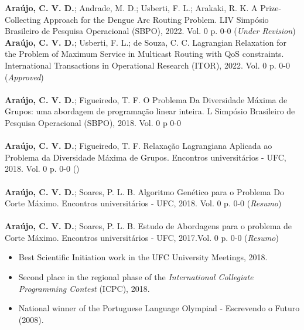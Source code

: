 \documentclass[10pt,a4paper,ragged2e,withhyper]{altacv}
\begin{document}
\begin{paracol}{1}
        \medskip
        \textbf{Araújo, C. V. D.}; Andrade, M. D.; Usberti, F. L.; Arakaki, R. K.
        \textcolor{SecondaryColor}{A Prize-Collecting Approach for the Dengue
          Arc Routing Problem}. LIV Simpósio Brasileiro de Pesquisa Operacional
        (SBPO), 2022. Vol. 0 p. 0-0 (\emph{Under Revision}) \\
        \textbf{Araújo, C. V. D.}; Usberti, F. L.; de Souza, C. C.
        \textcolor{SecondaryColor}{Lagrangian Relaxation for the Problem of Maximum Service in Multicast Routing with QoS constraints}. International Transactions in Operational Research (ITOR), 2022. Vol. 0 p. 0-0 (\emph{Approved}) \\
        \divider \\
        \textbf{Araújo, C. V. D.}; Figueiredo, T. F.
        \textcolor{SecondaryColor}{O Problema Da Diversidade Máxima de Grupos: uma abordagem de programação linear inteira}.  L Simpósio Brasileiro de Pesquisa Operacional (SBPO), 2018. Vol. 0 p 0-0 \\
    		\divider \\
    		\textbf{Araújo, C. V. D.}; Figueiredo, T. F.
    		\textcolor{SecondaryColor}{Relaxação Lagrangiana Aplicada ao Problema da Diversidade Máxima de Grupos}. Encontros universitários - UFC, 2018. Vol. 0 p. 0-0 (\emph{}) \\
    		\divider \\
    		\textbf{Araújo, C. V. D.}; Soares, P. L. B. 
    		\textcolor{SecondaryColor}{Algoritmo Genético para o Problema Do Corte Máximo}. Encontros universitários - UFC, 2018. Vol. 0 p. 0-0 (\emph{Resumo}) \\
            \divider \\
            \textbf{Araújo, C. V. D.}; Soares, P. L. B.
            \textcolor{SecondaryColor}{Estudo de Abordagens para o problema de Corte Máximo}. Encontros universitários  - UFC, 2017.Vol. 0 p. 0-0 (\emph{Resumo}) \\
	    \medskip
        \begin{itemize}
            \item Best Scientific Initiation work in the
              \textcolor{SecondaryColor}{UFC University Meetings, 2018}.
            \item Second place in the regional phase of the \textcolor{SecondaryColor}{\textit{International Collegiate Programming Contest} (ICPC), 2018}.
            \item National winner of the \textcolor{SecondaryColor}{Portuguese
                Language Olympiad - Escrevendo o Futuro (2008)}.     
        \end{itemize}
    \end{paracol}
\end{document}
